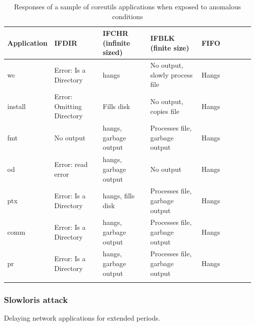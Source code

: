 \begin{table}[t]
    \scriptsize{}
    \begin{tabular}{l  l  |  l  l  l  l  l  l  l}
    \toprule{}
        Application   & IFDIR                     & IFCHR (infinite sized)& IFBLK (finite size)             & FIFO \\
\hline
        wc            & Error: Is a Directory     & hangs                 & No output, slowly process file  & Hangs\\
        install       & Error: Omitting Directory & Fills disk            & No output, copies file          & Hangs\\
        fmt           & No output                 & hangs, garbage output & Processes file, garbage output  & Hangs\\
        od            & Error: read error         & hangs, garbage output & No output                       & Hangs\\
        ptx           & Error: Is a Directory     & hangs, fills disk     & Processes file, garbage output  & Hangs\\
        comm          & Error: Is a Directory     & hangs, garbage output & Processes file, garbage output  & Hangs\\
        pr            & Error: Is a Directory     & hangs, garbage output & Processes file, garbage output  & Hangs\\
\hline
    \bottomrule{}
    \end{tabular}
    \caption{Responses of a sample of coreutils applications when exposed to anomalous conditions}
    \label{table:applicationresponses}
\end{table}


\subsubsection{Slowloris attack} Delaying network applications for extended
periods.





